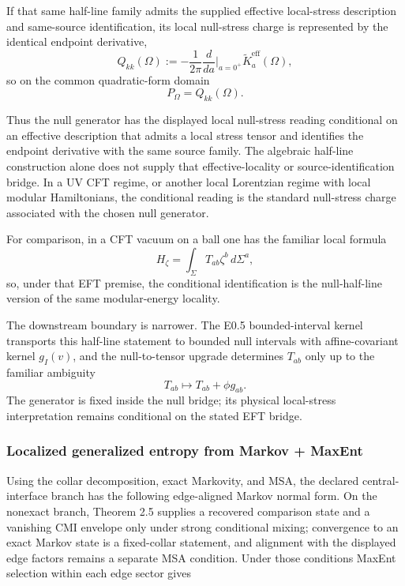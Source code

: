 If that same half-line family admits the supplied effective local-stress description and same-source identification, its local null-stress charge is represented by the identical endpoint derivative,
\[
Q_{kk}(\Omega)
:=
-\frac{1}{2\pi}\frac{d}{da}\Big|_{a=0^+}\widetilde K^{\mathrm{eff}}_a(\Omega),
\]
so on the common quadratic-form domain
\[
P_\Omega = Q_{kk}(\Omega).
\]

Thus the null generator has the displayed local null-stress reading conditional on an effective description that admits a local stress tensor and identifies the endpoint derivative with the same source family. The algebraic half-line construction alone does not supply that effective-locality or source-identification bridge. In a UV CFT regime, or another local Lorentzian regime with local modular Hamiltonians, the conditional reading is the standard null-stress charge associated with the chosen null generator.

For comparison, in a CFT vacuum on a ball one has the familiar local formula
\[
H_{\zeta}=\int_{\Sigma}T_{ab}\zeta^b\,d\Sigma^a,
\]
so, under that EFT premise, the conditional identification is the null-half-line version of the same modular-energy locality.

The downstream boundary is narrower. The E0.5 bounded-interval kernel transports this half-line statement to bounded null intervals with affine-covariant kernel \(g_I(v)\), and the null-to-tensor upgrade determines \(T_{ab}\) only up to the familiar ambiguity
\[
T_{ab}\mapsto T_{ab}+\phi g_{ab}.
\]
The generator is fixed inside the null bridge; its physical local-stress interpretation remains conditional on the stated EFT bridge.

\subsubsection{Localized generalized entropy from Markov + MaxEnt}\label{54-localized-generalized-entropy-from-markov--maxent}

Using the collar decomposition, exact Markovity, and MSA, the declared central-interface branch has the following edge-aligned Markov normal form. On the nonexact branch, Theorem 2.5 supplies a recovered comparison state and a vanishing CMI envelope only under strong conditional mixing; convergence to an exact Markov state is a fixed-collar statement, and alignment with the displayed edge factors remains a separate MSA condition. Under those conditions MaxEnt selection within each edge sector gives

